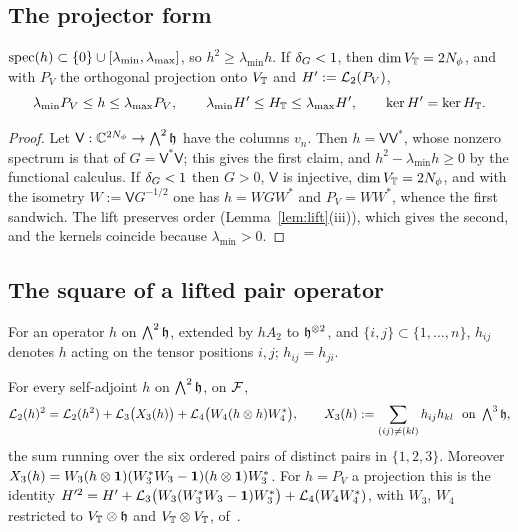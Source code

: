 \subsection{The projector form}

\begin{proposition}\label{prop:projector}
$\operatorname{spec}(h)\subset\{0\}\cup[\lambda_{\min},\lambda_{\max}]$, so $h^2\ge\lambda_{\min}h$. If $\delta_G<1$, then $\dim V_{\mathbb{T}}=2N_{\phi}$, and
with $P_V$ the orthogonal projection onto $V_{\mathbb{T}}$ and $H':=\mathcal{L}_2(P_V)$,
\[
\lambda_{\min}P_V\le h\le\lambda_{\max}P_V,\qquad \lambda_{\min}H'\le H_{\mathbb{T}}\le\lambda_{\max}H',\qquad \ker H'=\ker H_{\mathbb{T}} .
\]
\end{proposition}

\begin{proof}
Let $\mathsf V:\mathbb{C}^{2N_{\phi}}\to\bigwedge^2\mathfrak{h}$ have the columns $v_n$. Then $h=\mathsf V\mathsf V^*$, whose nonzero spectrum is that of
$G=\mathsf V^*\mathsf V$; this gives the first claim, and $h^2-\lambda_{\min}h\ge0$ by the functional calculus. If $\delta_G<1$ then
$G>0$, $\mathsf V$ is injective, $\dim V_{\mathbb{T}}=2N_{\phi}$, and with the isometry $W:=\mathsf VG^{-1/2}$ one has $h=WGW^*$ and $P_V=WW^*$,
whence the first sandwich. The lift
preserves order (Lemma~\ref{lem:lift}(iii)), which gives the second, and the kernels coincide because $\lambda_{\min}>0$.
\end{proof}

\subsection{The square of a lifted pair operator}

For an operator $h$ on $\bigwedge^2\mathfrak{h}$, extended by $hA_2$ to $\mathfrak{h}^{\otimes2}$, and $\{i,j\}\subset\{1,\dots,n\}$, $h_{ij}$ denotes
$h$ acting on the tensor positions $i,j$; $h_{ij}=h_{ji}$.

\begin{lemma}\label{lem:square}
For every self-adjoint $h$ on $\bigwedge^2\mathfrak{h}$, on $\mathcal{F}$,
\begin{equation}\label{eq:square}
\mathcal{L}_2(h)^2=\mathcal{L}_2(h^2)+\mathcal{L}_3\bigl(X_3(h)\bigr)+\mathcal{L}_4\bigl(W_4(h\otimes h)W_4^*\bigr),\qquad
X_3(h):=\sum_{(ij)\neq(kl)}h_{ij}h_{kl}\ \text{ on }\textstyle\bigwedge^3\mathfrak{h},
\end{equation}
the sum running over the six ordered pairs of distinct pairs in $\{1,2,3\}$. Moreover
$X_3(h)=W_3(h\otimes\mathbf{1})(W_3^*W_3-\mathbf{1})(h\otimes\mathbf{1})W_3^*$. For $h=P_V$ a projection this is the identity
$H'^2=H'+\mathcal{L}_3\bigl(W_3(W_3^*W_3-\mathbf{1})W_3^*\bigr)+\mathcal{L}_4(W_4W_4^*)$, with $W_3$, $W_4$ restricted to $V_{\mathbb{T}}\otimes\mathfrak{h}$ and
$V_{\mathbb{T}}\otimes V_{\mathbb{T}}$, of~\cite[Lemma~2.1 (Normal-ordered square)]{OAI:A-Fock-space-inequality-and-the-Laughlin-spectral-gap-September-24-2026}.
\end{lemma}

